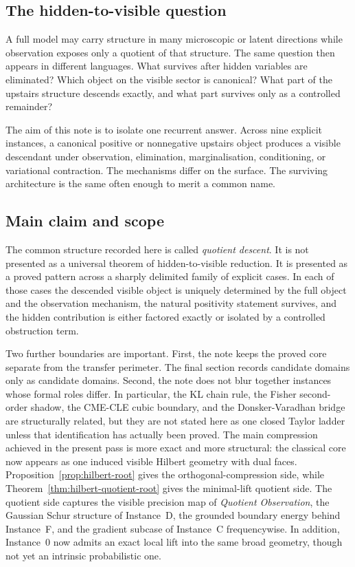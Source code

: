 \documentclass[11pt,a4paper]{article}
\numberwithin{equation}{section}
\theoremstyle{thmcompact}
\theoremstyle{remark}
\begin{document}
\subsection{The hidden-to-visible question}

A full model may carry structure in many microscopic or latent directions while observation exposes only a quotient of that structure. The same question then appears in different languages. What survives after hidden variables are eliminated? Which object on the visible sector is canonical? What part of the upstairs structure descends exactly, and what part survives only as a controlled remainder?

The aim of this note is to isolate one recurrent answer. Across nine explicit instances, a canonical positive or nonnegative upstairs object produces a visible descendant under observation, elimination, marginalisation, conditioning, or variational contraction. The mechanisms differ on the surface. The surviving architecture is the same often enough to merit a common name.

\subsection{Main claim and scope}

The common structure recorded here is called \emph{quotient descent}. It is not presented as a universal theorem of hidden-to-visible reduction. It is presented as a proved pattern across a sharply delimited family of explicit cases. In each of those cases the descended visible object is uniquely determined by the full object and the observation mechanism, the natural positivity statement survives, and the hidden contribution is either factored exactly or isolated by a controlled obstruction term.

Two further boundaries are important. First, the note keeps the proved core separate from the transfer perimeter. The final section records candidate domains only as candidate domains. Second, the note does not blur together instances whose formal roles differ. In particular, the KL chain rule, the Fisher second-order shadow, the CME-CLE cubic boundary, and the Donsker-Varadhan bridge are structurally related, but they are not stated here as one closed Taylor ladder unless that identification has actually been proved. The main compression achieved in the present pass is more exact and more structural: the classical core now appears as one induced visible Hilbert geometry with dual faces. Proposition~\ref{prop:hilbert-root} gives the orthogonal-compression side, while Theorem~\ref{thm:hilbert-quotient-root} gives the minimal-lift quotient side. The quotient side captures the visible precision map of \emph{Quotient Observation}, the Gaussian Schur structure of Instance~D, the grounded boundary energy behind Instance~F, and the gradient subcase of Instance~C frequencywise. In addition, Instance~0 now admits an exact local lift into the same broad geometry, though not yet an intrinsic probabilistic one.
\end{document}
